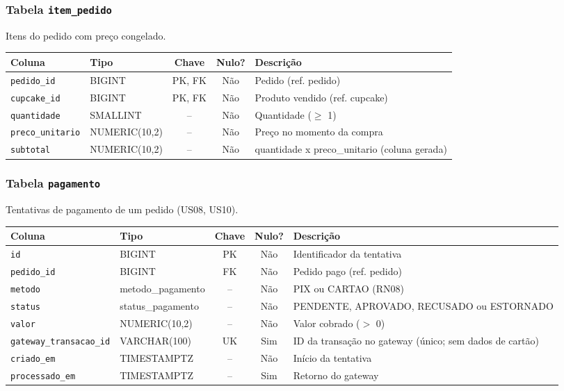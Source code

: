 \subsubsection{Tabela \texttt{item\_pedido}}
\noindent Itens do pedido com preço congelado.\par\smallskip
\begingroup\footnotesize\renewcommand{\arraystretch}{1.2}
\begin{longtable}{|p{3.0cm}|p{2.6cm}|c|c|p{5.6cm}|}
\hline
\rowcolor{gray!40}\textbf{Coluna} & \textbf{Tipo} & \textbf{Chave} & \textbf{Nulo?} & \textbf{Descrição} \\ \hline
\endhead
\texttt{pedido\_id} & BIGINT & PK, FK & Não & Pedido (ref. pedido) \\ \hline
\texttt{cupcake\_id} & BIGINT & PK, FK & Não & Produto vendido (ref. cupcake) \\ \hline
\texttt{quantidade} & SMALLINT & -- & Não & Quantidade ($\geq$ 1) \\ \hline
\texttt{preco\_unitario} & NUMERIC(10,2) & -- & Não & Preço no momento da compra \\ \hline
\texttt{subtotal} & NUMERIC(10,2) & -- & Não & quantidade x preco\_unitario (coluna gerada) \\ \hline
\end{longtable}
\endgroup
\subsubsection{Tabela \texttt{pagamento}}
\noindent Tentativas de pagamento de um pedido (US08, US10).\par\smallskip
\begingroup\footnotesize\renewcommand{\arraystretch}{1.2}
\begin{longtable}{|p{3.0cm}|p{2.6cm}|c|c|p{5.6cm}|}
\hline
\rowcolor{gray!40}\textbf{Coluna} & \textbf{Tipo} & \textbf{Chave} & \textbf{Nulo?} & \textbf{Descrição} \\ \hline
\endhead
\texttt{id} & BIGINT & PK & Não & Identificador da tentativa \\ \hline
\texttt{pedido\_id} & BIGINT & FK & Não & Pedido pago (ref. pedido) \\ \hline
\texttt{metodo} & metodo\_pagamento & -- & Não & PIX ou CARTAO (RN08) \\ \hline
\texttt{status} & status\_pagamento & -- & Não & PENDENTE, APROVADO, RECUSADO ou ESTORNADO \\ \hline
\texttt{valor} & NUMERIC(10,2) & -- & Não & Valor cobrado ($>$ 0) \\ \hline
\texttt{gateway\_transacao\_id} & VARCHAR(100) & UK & Sim & ID da transação no gateway (único; sem dados de cartão) \\ \hline
\texttt{criado\_em} & TIMESTAMPTZ & -- & Não & Início da tentativa \\ \hline
\texttt{processado\_em} & TIMESTAMPTZ & -- & Sim & Retorno do gateway \\ \hline
\end{longtable}
\endgroup
